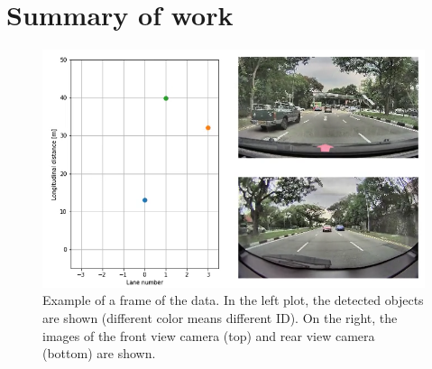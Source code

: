 \documentclass[10pt,final,a4paper,oneside,onecolumn]{article}
\begin{document}
\section{Summary of work}

\begin{figure}
	\centering
	\includegraphics[width=0.8\linewidth]{bmw_example}
	\caption{Example of a frame of the data. In the left plot, the detected objects are shown (different color means different ID). On the right, the images of the front view camera (top) and rear view camera (bottom) are shown.}
	\label{fig:bmw example}
\end{figure}
\end{document}
